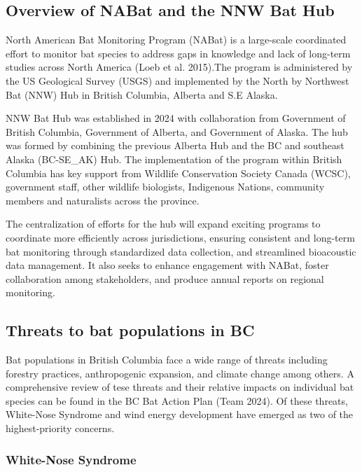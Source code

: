 \documentclass[
  letterpaper,
  DIV=11,
  numbers=noendperiod]{scrartcl}
\begin{document}
\subsection{Overview of NABat and the NNW Bat
Hub}\label{overview-of-nabat-and-the-nnw-bat-hub}

North American Bat Monitoring Program (NABat) is a large-scale
coordinated effort to monitor bat species to address gaps in knowledge
and lack of long-term studies across North America (Loeb et al.
2015).The program is administered by the US Geological Survey (USGS) and
implemented by the North by Northwest Bat (NNW) Hub in British Columbia,
Alberta and S.E Alaska.

NNW Bat Hub was established in 2024 with collaboration from Government
of British Columbia, Government of Alberta, and Government of Alaska.
The hub was formed by combining the previous Alberta Hub and the BC and
southeast Alaska (BC-SE\_AK) Hub. The implementation of the program
within British Columbia has key support from Wildlife Conservation
Society Canada (WCSC), government staff, other wildlife biologists,
Indigenous Nations, community members and naturalists across the
province.

The centralization of efforts for the hub will expand exciting programs
to coordinate more efficiently across jurisdictions, ensuring consistent
and long-term bat monitoring through standardized data collection, and
streamlined bioacoustic data management. It also seeks to enhance
engagement with NABat, foster collaboration among stakeholders, and
produce annual reports on regional monitoring.

\subsection{Threats to bat populations in
BC}\label{threats-to-bat-populations-in-bc}

Bat populations in British Columbia face a wide range of threats
including forestry practices, anthropogenic expansion, and climate
change among others. A comprehensive review of tese threats and their
relative impacts on individual bat species can be found in the BC Bat
Action Plan (Team 2024). Of these threats, White-Nose Syndrome and wind
energy development have emerged as two of the highest-priority concerns.

\subsubsection{White-Nose Syndrome}\label{white-nose-syndrome}
\end{document}
